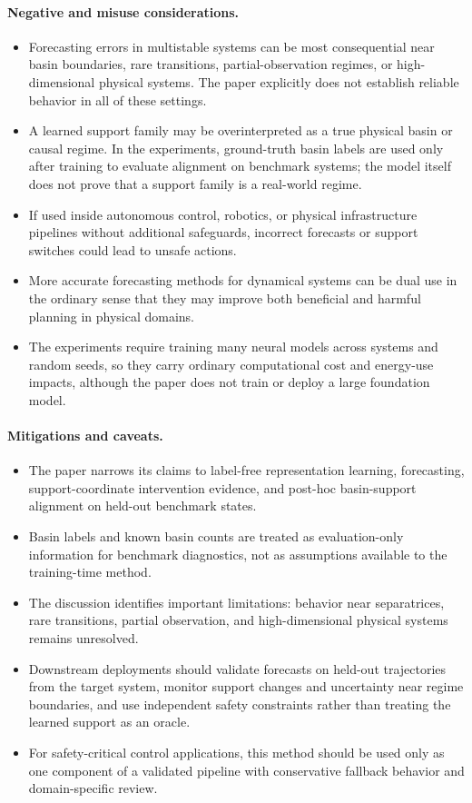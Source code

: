 \paragraph{Negative and misuse considerations.}
\begin{itemize}
  \item Forecasting errors in multistable systems can be most consequential near basin boundaries, rare transitions, partial-observation regimes, or high-dimensional physical systems. The paper explicitly does not establish reliable behavior in all of these settings.
  \item A learned support family may be overinterpreted as a true physical basin or causal regime. In the experiments, ground-truth basin labels are used only after training to evaluate alignment on benchmark systems; the model itself does not prove that a support family is a real-world regime.
  \item If used inside autonomous control, robotics, or physical infrastructure pipelines without additional safeguards, incorrect forecasts or support switches could lead to unsafe actions.
  \item More accurate forecasting methods for dynamical systems can be dual use in the ordinary sense that they may improve both beneficial and harmful planning in physical domains.
  \item The experiments require training many neural models across systems and random seeds, so they carry ordinary computational cost and energy-use impacts, although the paper does not train or deploy a large foundation model.
\end{itemize}

\paragraph{Mitigations and caveats.}
\begin{itemize}
  \item The paper narrows its claims to label-free representation learning, forecasting, support-coordinate intervention evidence, and post-hoc basin-support alignment on held-out benchmark states.
  \item Basin labels and known basin counts are treated as evaluation-only information for benchmark diagnostics, not as assumptions available to the training-time method.
  \item The discussion identifies important limitations: behavior near separatrices, rare transitions, partial observation, and high-dimensional physical systems remains unresolved.
  \item Downstream deployments should validate forecasts on held-out trajectories from the target system, monitor support changes and uncertainty near regime boundaries, and use independent safety constraints rather than treating the learned support as an oracle.
  \item For safety-critical control applications, this method should be used only as one component of a validated pipeline with conservative fallback behavior and domain-specific review.
\end{itemize}
